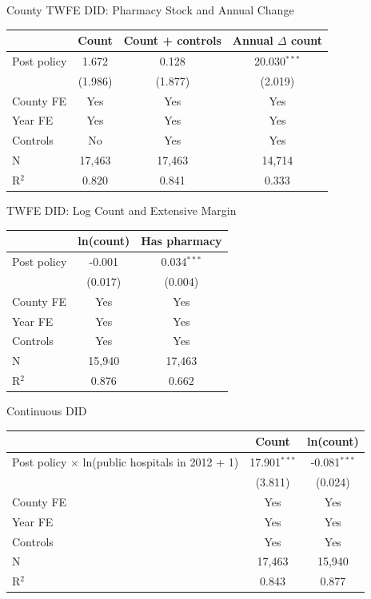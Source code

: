 \documentclass{beamer}
\begin{document}
\begin{frame}{County TWFE DID: Pharmacy Stock and Annual Change}

\centering
\scriptsize
\setlength{\tabcolsep}{6pt}

\begin{tabular}{lccc}
\toprule
& Count & Count + controls & Annual $\Delta$ count \\
\midrule
Post policy
& 1.672 & 0.128 & 20.030$^{***}$ \\
& (1.986) & (1.877) & (2.019) \\
\midrule
County FE & Yes & Yes & Yes \\
Year FE & Yes & Yes & Yes \\
Controls & No & Yes & Yes \\
\midrule
N & 17,463 & 17,463 & 14,714 \\
R$^2$ & 0.820 & 0.841 & 0.333 \\
\bottomrule
\end{tabular}

\end{frame}

\begin{frame}{ TWFE DID: Log Count and Extensive Margin}

\centering
\scriptsize
\setlength{\tabcolsep}{7pt}

\begin{tabular}{lcc}
\toprule
& ln(count) & Has pharmacy \\
\midrule
Post policy
& -0.001 & 0.034$^{***}$ \\
& (0.017) & (0.004) \\
\midrule
County FE & Yes & Yes \\
Year FE & Yes & Yes \\
Controls & Yes & Yes \\
\midrule
N & 15,940 & 17,463 \\
R$^2$ & 0.876 & 0.662 \\
\bottomrule
\end{tabular}

\end{frame}
\begin{frame}{ Continuous DID}

\centering
\scriptsize
\setlength{\tabcolsep}{7pt}

\begin{tabular}{lcc}
\toprule
& Count & ln(count) \\
\midrule
Post policy $\times$ ln(public hospitals in 2012 + 1)
& 17.901$^{***}$ & -0.081$^{***}$ \\
& (3.811) & (0.024) \\
\midrule
County FE & Yes & Yes \\
Year FE & Yes & Yes \\
Controls & Yes & Yes \\
\midrule
N & 17,463 & 15,940 \\
R$^2$ & 0.843 & 0.877 \\
\bottomrule
\end{tabular}


\end{frame}
\end{document}
